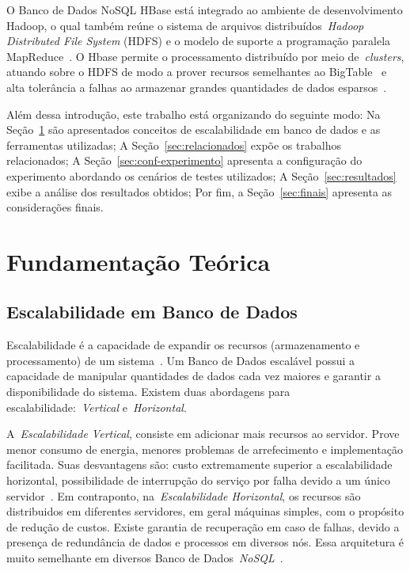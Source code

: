 \documentclass[12pt]{article}
\begin{document}
O Banco de Dados NoSQL HBase está integrado ao ambiente de desenvolvimento Hadoop, o qual também reúne o sistema de arquivos distribuídos~\emph{Hadoop Distributed File System} (HDFS) e o modelo de suporte a programação paralela MapReduce~\cite{hadoophbase}. O Hbase permite o processamento distribuído por meio de~\emph{clusters}, atuando sobre o HDFS de modo a prover recursos semelhantes ao BigTable~\cite{chang2008bigtable} e alta tolerância a falhas ao armazenar grandes quantidades de dados esparsos~\cite{hadoophbase}.

Além dessa introdução, este trabalho está organizando do seguinte modo: Na Seção~\ref{sec:fundamentacao} são apresentados conceitos de escalabilidade em banco de dados e as ferramentas utilizadas; A Seção~\ref{sec:relacionados} expõe os trabalhos relacionados; A Seção~\ref{sec:conf-experimento} apresenta a configuração do experimento abordando os cenários de testes utilizados; A Seção~\ref{sec:resultados} exibe a análise dos resultados obtidos; Por fim, a Seção~\ref{sec:finais} apresenta as considerações finais.

\section{Fundamentação Teórica}
\label{sec:fundamentacao}

\subsection{Escalabilidade em Banco de Dados}
\label{subsec:escalabilidade}

Escalabilidade é a capacidade de expandir os recursos (armazenamento e processamento) de um sistema~\cite{elmasri2010fundamentals}. Um Banco de Dados escalável possui a capacidade de manipular quantidades de dados cada vez maiores e garantir a disponibilidade do sistema. Existem duas abordagens para escalabilidade:~\emph{Vertical} e~\emph{Horizontal}.

A~\emph{Escalabilidade Vertical}, consiste em adicionar mais recursos ao servidor. Prove menor consumo de energia, menores problemas de arrefecimento e implementação facilitada. Suas desvantagens são: custo extremamente superior a escalabilidade horizontal, possibilidade de interrupção do serviço por falha devido a um único servidor~\cite{hwang2014scale}. Em contraponto, na~\emph{Escalabilidade Horizontal}, os recursos são distribuidos em diferentes servidores, em geral máquinas simples, com o propósito de redução de custos. Existe garantia de recuperação em caso de falhas, devido a presença de redundância de dados e processos em diversos nós. Essa arquitetura é muito semelhante em diversos Banco de Dados~\textit{NoSQL}~\cite{hwang2014scale}.
\end{document}
